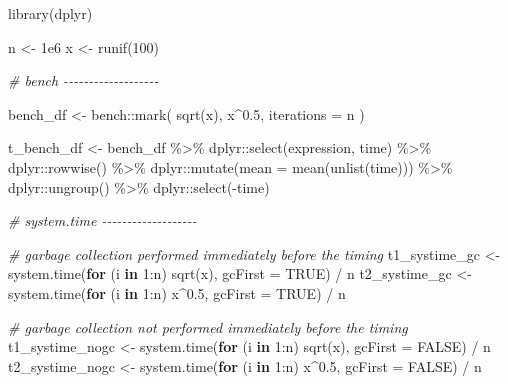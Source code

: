 \documentclass[
]{book}
\newenvironment{Shaded}{\begin{snugshade}}{\end{snugshade}}
\newcommand{\AttributeTok}[1]{\textcolor[rgb]{0.77,0.63,0.00}{#1}}
\newcommand{\CommentTok}[1]{\textcolor[rgb]{0.56,0.35,0.01}{\textit{#1}}}
\newcommand{\ConstantTok}[1]{\textcolor[rgb]{0.00,0.00,0.00}{#1}}
\newcommand{\ControlFlowTok}[1]{\textcolor[rgb]{0.13,0.29,0.53}{\textbf{#1}}}
\newcommand{\DecValTok}[1]{\textcolor[rgb]{0.00,0.00,0.81}{#1}}
\newcommand{\FloatTok}[1]{\textcolor[rgb]{0.00,0.00,0.81}{#1}}
\newcommand{\FunctionTok}[1]{\textcolor[rgb]{0.00,0.00,0.00}{#1}}
\newcommand{\NormalTok}[1]{#1}
\newcommand{\OtherTok}[1]{\textcolor[rgb]{0.56,0.35,0.01}{#1}}
\newcommand{\SpecialCharTok}[1]{\textcolor[rgb]{0.00,0.00,0.00}{#1}}
\begin{document}
\begin{Shaded}
\begin{Highlighting}[]
\FunctionTok{library}\NormalTok{(dplyr)}

\NormalTok{n }\OtherTok{\textless{}{-}} \FloatTok{1e6}
\NormalTok{x }\OtherTok{\textless{}{-}} \FunctionTok{runif}\NormalTok{(}\DecValTok{100}\NormalTok{)}

\CommentTok{\# bench {-}{-}{-}{-}{-}{-}{-}{-}{-}{-}{-}{-}{-}{-}{-}{-}{-}{-}{-}}

\NormalTok{bench\_df }\OtherTok{\textless{}{-}}\NormalTok{ bench}\SpecialCharTok{::}\FunctionTok{mark}\NormalTok{(}
  \FunctionTok{sqrt}\NormalTok{(x),}
\NormalTok{  x}\SpecialCharTok{\^{}}\FloatTok{0.5}\NormalTok{,}
  \AttributeTok{iterations =}\NormalTok{ n}
\NormalTok{)}

\NormalTok{t\_bench\_df }\OtherTok{\textless{}{-}}\NormalTok{ bench\_df }\SpecialCharTok{\%\textgreater{}\%}
\NormalTok{  dplyr}\SpecialCharTok{::}\FunctionTok{select}\NormalTok{(expression, time) }\SpecialCharTok{\%\textgreater{}\%}
\NormalTok{  dplyr}\SpecialCharTok{::}\FunctionTok{rowwise}\NormalTok{() }\SpecialCharTok{\%\textgreater{}\%}
\NormalTok{  dplyr}\SpecialCharTok{::}\FunctionTok{mutate}\NormalTok{(}\AttributeTok{mean =} \FunctionTok{mean}\NormalTok{(}\FunctionTok{unlist}\NormalTok{(time))) }\SpecialCharTok{\%\textgreater{}\%}
\NormalTok{  dplyr}\SpecialCharTok{::}\FunctionTok{ungroup}\NormalTok{() }\SpecialCharTok{\%\textgreater{}\%}
\NormalTok{  dplyr}\SpecialCharTok{::}\FunctionTok{select}\NormalTok{(}\SpecialCharTok{{-}}\NormalTok{time)}

\CommentTok{\# system.time {-}{-}{-}{-}{-}{-}{-}{-}{-}{-}{-}{-}{-}{-}{-}{-}{-}{-}{-}}

\CommentTok{\# garbage collection performed immediately before the timing}
\NormalTok{t1\_systime\_gc }\OtherTok{\textless{}{-}} \FunctionTok{system.time}\NormalTok{(}\ControlFlowTok{for}\NormalTok{ (i }\ControlFlowTok{in} \DecValTok{1}\SpecialCharTok{:}\NormalTok{n) }\FunctionTok{sqrt}\NormalTok{(x), }\AttributeTok{gcFirst =} \ConstantTok{TRUE}\NormalTok{) }\SpecialCharTok{/}\NormalTok{ n}
\NormalTok{t2\_systime\_gc }\OtherTok{\textless{}{-}} \FunctionTok{system.time}\NormalTok{(}\ControlFlowTok{for}\NormalTok{ (i }\ControlFlowTok{in} \DecValTok{1}\SpecialCharTok{:}\NormalTok{n) x}\SpecialCharTok{\^{}}\FloatTok{0.5}\NormalTok{, }\AttributeTok{gcFirst =} \ConstantTok{TRUE}\NormalTok{) }\SpecialCharTok{/}\NormalTok{ n}

\CommentTok{\# garbage collection not performed immediately before the timing}
\NormalTok{t1\_systime\_nogc }\OtherTok{\textless{}{-}} \FunctionTok{system.time}\NormalTok{(}\ControlFlowTok{for}\NormalTok{ (i }\ControlFlowTok{in} \DecValTok{1}\SpecialCharTok{:}\NormalTok{n) }\FunctionTok{sqrt}\NormalTok{(x), }\AttributeTok{gcFirst =} \ConstantTok{FALSE}\NormalTok{) }\SpecialCharTok{/}\NormalTok{ n}
\NormalTok{t2\_systime\_nogc }\OtherTok{\textless{}{-}} \FunctionTok{system.time}\NormalTok{(}\ControlFlowTok{for}\NormalTok{ (i }\ControlFlowTok{in} \DecValTok{1}\SpecialCharTok{:}\NormalTok{n) x}\SpecialCharTok{\^{}}\FloatTok{0.5}\NormalTok{, }\AttributeTok{gcFirst =} \ConstantTok{FALSE}\NormalTok{) }\SpecialCharTok{/}\NormalTok{ n}


\end{Highlighting}
\end{Shaded}
\end{document}
